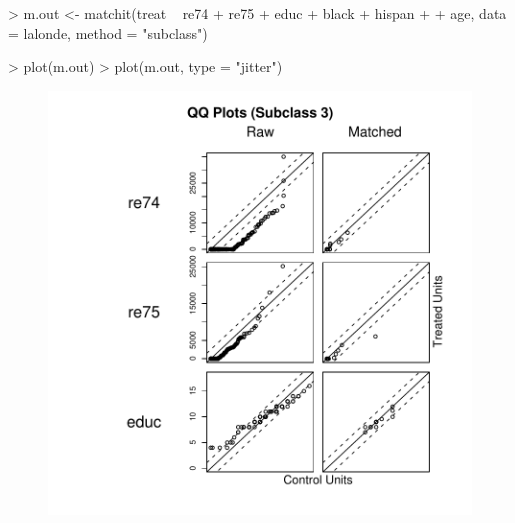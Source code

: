 \documentclass[oneside,letterpaper,titlepage]{article}
\begin{document}
\begin{enumerate}
\begin{Schunk}
\begin{Sinput}
> m.out <- matchit(treat ~ re74 + re75 + educ + black + hispan + 
+     age, data = lalonde, method = "subclass")
\end{Sinput}
\end{Schunk}
\begin{Schunk}
\begin{Sinput}
> plot(m.out)
> plot(m.out, type = "jitter")
\end{Sinput}
\end{Schunk}


\begin{figure}[tbp]
  \begin{center}
    \includegraphics[scale=.25]{figs/qqplotsub}

\end{center}
\end{figure}
\end{enumerate}
\end{document}
